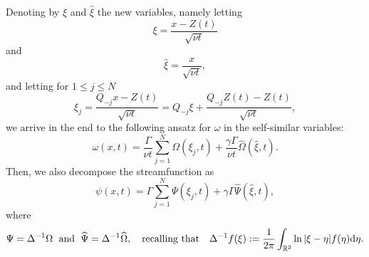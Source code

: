 \documentclass[11pt,reqno,a4paper]{amsart}
\def\dd{{\rm d}}
\def\RR {\mathbb{R}}
\newcommand{\1}{\mathbbm{1}}
\theoremstyle{definition}
\theoremstyle{definition}
\numberwithin{equation}{section}
\begin{document}
Denoting by $\xi$ and $\widehat{\xi}$ the new variables, namely letting
\begin{equation}\label{def:xi}
    \xi = \frac{x-Z(t)}{\sqrt{\nu t}}
\end{equation}
and 
\begin{equation}\label{def:xi0}
    \widehat{\xi} = \frac{x}{\sqrt{\nu t}},
\end{equation}
and letting for $1 \le j \le N$
\begin{equation}\label{def:xi_j}
    \xi_j = \frac{Q_{-j}x-Z(t)}{\sqrt{\nu t}} = Q_{-j} \xi + \frac{Q_{-j}Z(t)-Z(t)}{\sqrt{\nu t}},
\end{equation}
we arrive in the end to the following ansatz for $\omega$ in the self-similar variables:
\begin{equation}\label{eq:omSS}
    \omega(x,t)=\frac{\Gamma}{\nu t}\sum_{j=1}^N \Omega(\xi_j,t)+\frac{\gamma \Gamma}{\nu t} \widehat{\Omega}(\widehat{\xi},t).
\end{equation}
Then, we also decompose the streamfunction as 
\begin{equation}
    \psi(x,t)=\Gamma \sum_{j=1}^N \Psi(\xi_j,t)+\gamma \Gamma \widehat{\Psi}(\widehat{\xi},t),
\end{equation}
where
\begin{equation}
    \Psi=\Delta^{-1}\Omega \; \text{ and } \; \widehat{\Psi}=\Delta^{-1} \widehat{\Omega}, \quad \text{recalling that}\quad \Delta^{-1}f(\xi):=\frac{1}{2\pi}\int_{\RR^2}\ln|\xi-\eta| f(\eta)\dd \eta.
\end{equation}
\end{document}
